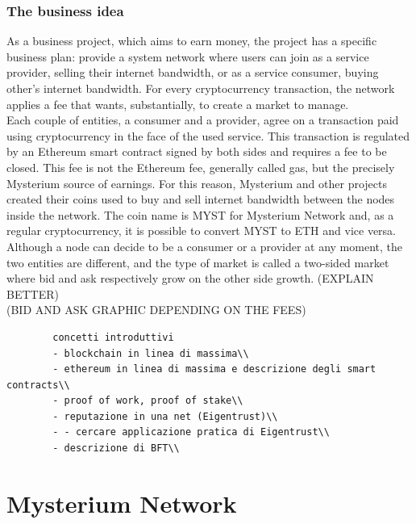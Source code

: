 \documentclass[12pt]{article}
\begin{document}
	\subsubsection{The business idea}
	As a business project, which aims to earn money, the project has a specific business plan: provide a system network where users can join as a service provider, selling their internet bandwidth, or as a service consumer, buying other's internet bandwidth. For every cryptocurrency transaction, the network applies a fee that wants, substantially, to create a market to manage.\\
	Each couple of entities, a consumer and a provider, agree on a transaction paid using cryptocurrency in the face of the used service. This transaction is regulated by an Ethereum smart contract signed by both sides and requires a fee to be closed. This fee is not the Ethereum fee, generally called gas, but the precisely Mysterium source of earnings. For this reason, Mysterium and other projects created their coins used to buy and sell internet bandwidth between the nodes inside the network. The coin name is MYST for Mysterium Network and, as a regular cryptocurrency, it is possible to convert MYST to ETH and vice versa.\\
	Although a node can decide to be a consumer or a provider at any moment, the two entities are different, and the type of market is called a two-sided market where bid and ask respectively grow on the other side growth. (EXPLAIN BETTER)\\

	(BID AND ASK GRAPHIC DEPENDING ON THE FEES)

	\begin{verbatim}
		concetti introduttivi
		- blockchain in linea di massima\\
		- ethereum in linea di massima e descrizione degli smart contracts\\
		- proof of work, proof of stake\\
		- reputazione in una net (Eigentrust)\\
		- - cercare applicazione pratica di Eigentrust\\
		- descrizione di BFT\\
	\end{verbatim}
	
	\section{Mysterium Network}
	
\end{document}
